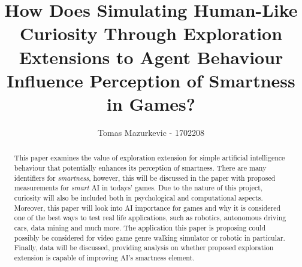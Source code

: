 \documentclass[journal]{IEEEtran}
\begin{document}
%
\title{How Does Simulating Human-Like Curiosity Through Exploration Extensions to Agent Behaviour Influence Perception of Smartness in Games?}
%
%
\author{Tomas Mazurkevic - 1702208}


\maketitle

\begin{abstract}
This paper examines the value of exploration extension for simple artificial intelligence behaviour that potentially enhances its perception of smartness. There are many identifiers for \textit{smartness}, however, this will be discussed in the paper with proposed measurements for \textit{smart} AI in todays' games. Due to the nature of this project, curiosity will also be included both in psychological and computational aspects. Moreover, this paper will look into AI importance for games and why it is considered one of the best ways to test real life applications, such as robotics, autonomous driving cars, data mining and much more. The application this paper is proposing could possibly be considered for video game genre walking simulator or robotic in particular. Finally, data will be discussed, providing analysis on whether proposed exploration extension is capable of improving AI's smartness element.
\end{abstract}
\end{document}
